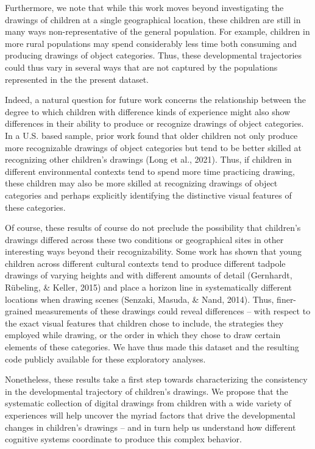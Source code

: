\documentclass[
  english,
  man]{apa6}
\begin{document}
Furthermore, we note that while this work moves beyond investigating the drawings of children at a single geographical location, these children are still in many ways non-representative of the general population. For example, children in more rural populations may spend considerably less time both consuming and producing drawings of object categories. Thus, these developmental trajectories could thus vary in several ways that are not captured by the populations represented in the the present dataset.

Indeed, a natural question for future work concerns the relationship between the degree to which children with difference kinds of experience might also show differences in their ability to produce or recognize drawings of object categories. In a U.S. based sample, prior work found that older children not only produce more recognizable drawings of object categories but tend to be better skilled at recognizing other children's drawings (Long et al., 2021). Thus, if children in different environmental contexts tend to spend more time practicing drawing, these children may also be more skilled at recognizing drawings of object categories and perhaps explicitly identifying the distinctive visual features of these categories.

Of course, these results of course do not preclude the possibility that children's drawings differed across these two conditions or geographical sites in other interesting ways beyond their recognizability. Some work has shown that young children across different cultural contexts tend to produce different tadpole drawings of varying heights and with different amounts of detail (Gernhardt, Rübeling, \& Keller, 2015) and place a horizon line in systematically different locations when drawing scenes (Senzaki, Masuda, \& Nand, 2014). Thus, finer-grained measurements of these drawings could reveal differences -- with respect to the exact visual features that children chose to include, the strategies they employed while drawing, or the order in which they chose to draw certain elements of these categories. We have thus made this dataset and the resulting code publicly available for these exploratory analyses.

Nonetheless, these results take a first step towards characterizing the consistency in the developmental trajectory of children's drawings. We propose that the systematic collection of digital drawings from children with a wide variety of experiences will help uncover the myriad factors that drive the developmental changes in children's drawings -- and in turn help us understand how different cognitive systems coordinate to produce this complex behavior.
\end{document}

